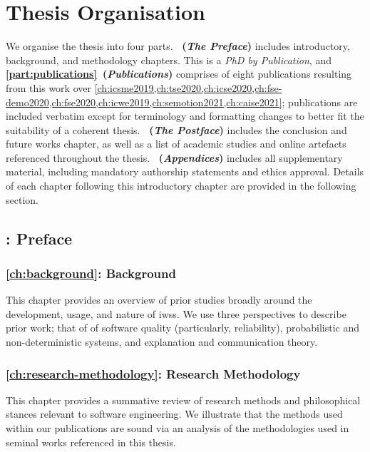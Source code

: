 \section{Thesis Organisation}
\label{sec:introduction:organisation}

We organise the thesis into four parts. \textbf{~(\textit{The Preface})} includes introductory, background, and methodology chapters. This is a \textit{PhD by Publication}, and \textbf{\cref{part:publications}~(\textit{Publications})} comprises of eight publications resulting from this work over \cref{ch:icsme2019,ch:tse2020,ch:icse2020,ch:fse-demo2020,ch:fse2020,ch:icwe2019,ch:semotion2021,ch:caise2021}; publications are included verbatim except for terminology and formatting changes to better fit the suitability of a coherent thesis. \textbf{~(\textit{The Postface})} includes the conclusion and future works chapter, as well as a list of academic studies and online artefacts referenced throughout the thesis. \textbf{~(\textit{Appendices})} includes all supplementary material, including mandatory authorship statements and ethics approval. Details of each chapter following this introductory chapter are provided in the following section.

\subsection[Part I: Preface]{: Preface}

\subsubsection[Chapter 2: Background]{\cref{ch:background}: Background} This chapter provides an overview of prior studies broadly around the development, usage, and nature of \glspl{iws}. We use three perspectives to describe prior work; that of of software quality (particularly, reliability), probabilistic and non-deterministic systems, and explanation and communication theory.

\subsubsection[Chapter 3: Research Methodology]{\cref{ch:research-methodology}: Research Methodology} This chapter provides a summative review of research methods and philosophical stances relevant to software engineering. We illustrate that the methods used within our publications are sound via an analysis of the methodologies used in seminal works referenced in this thesis.

